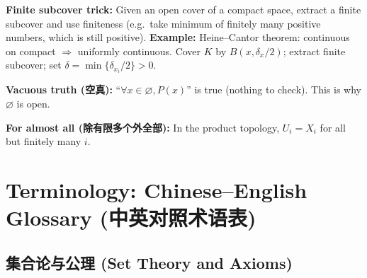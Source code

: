 \documentclass{article}
\begin{document}
\textbf{Finite subcover trick:} Given an open cover of a compact
space, extract a finite subcover and use finiteness (e.g.\ take
minimum of finitely many positive numbers, which is still positive).
\textbf{Example:} Heine--Cantor theorem: continuous on compact
$\Rightarrow$ uniformly continuous. Cover $K$ by $B(x,
\delta_x/2)$; extract finite subcover; set $\delta =
\min\{\delta_{x_i}/2\} > 0$.

\textbf{Vacuous truth (空真):} ``$\forall x \in \varnothing, P(x)$'' is
true (nothing to check). This is why $\varnothing$ is open.

\textbf{For almost all (除有限多个外全部):} In the product topology, $U_i =
X_i$ for all but finitely many $i$.

\newpage
\section{Terminology: Chinese--English Glossary (中英对照术语表)}

\subsection*{集合论与公理 (Set Theory and Axioms)}
\end{document}
